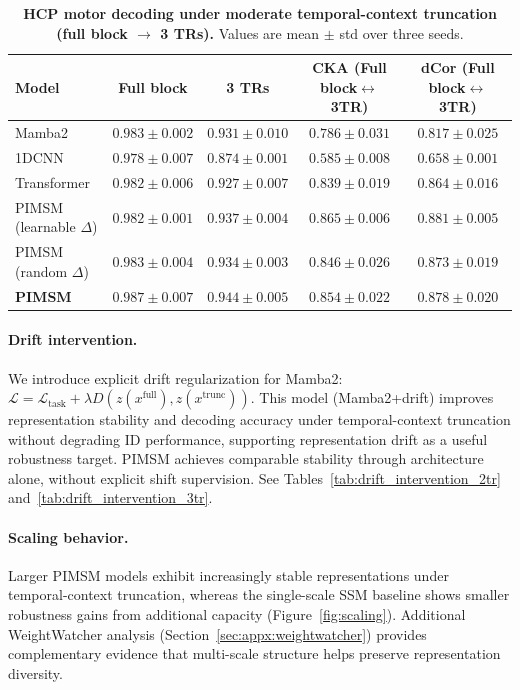 \documentclass{article}
\begin{document}
\begin{table}[htbp]
\centering
\footnotesize
\begin{tabular}{lcccc}
\toprule
Model & Full block & 3 TRs & CKA (Full block$\leftrightarrow$3TR) & dCor (Full block$\leftrightarrow$3TR) \\
\midrule
Mamba2 & $0.983\pm0.002$ & $0.931\pm0.010$ & $0.786\pm0.031$ & $0.817\pm0.025$ \\
1DCNN & $0.978\pm0.007$ & $0.874\pm0.001$ & $0.585\pm0.008$ & $0.658\pm0.001$ \\
Transformer & $0.982\pm0.006$ & $0.927\pm0.007$ & $0.839\pm0.019$ & $0.864\pm0.016$ \\
PIMSM (learnable $\Delta$) & $0.982\pm0.001$ & $0.937\pm0.004$ & $0.865\pm0.006$ & $0.881\pm0.005$ \\
PIMSM (random $\Delta$) & $0.983\pm0.004$ & $0.934\pm0.003$ & $0.846\pm0.026$ & $0.873\pm0.019$ \\
\midrule
\textbf{PIMSM} & $\mathbf{0.987\pm0.007}$ & $\mathbf{0.944\pm0.005}$ & $\mathbf{0.854\pm0.022}$ & $\mathbf{0.878\pm0.020}$ \\
\bottomrule
\end{tabular}
\caption{
\textbf{HCP motor decoding under moderate temporal-context truncation (full block $\rightarrow$ 3 TRs).}
Values are mean $\pm$ std over three seeds.
}
\label{tab:drift3tr}
\end{table}


\paragraph{Drift intervention.}
We introduce explicit drift regularization for Mamba2: $\mathcal{L} = \mathcal{L}_{\text{task}} + \lambda D(z(x^{\text{full}}), z(x^{\text{trunc}}))$. This model (Mamba2+drift) improves representation stability and decoding accuracy under temporal-context truncation without degrading ID performance, supporting representation drift as a useful robustness target. PIMSM achieves comparable stability through architecture alone, without explicit shift supervision. See Tables~\ref{tab:drift_intervention_2tr} and~\ref{tab:drift_intervention_3tr}.

\paragraph{Scaling behavior.}
Larger PIMSM models exhibit increasingly stable representations under temporal-context truncation, whereas the single-scale SSM baseline shows smaller robustness gains from additional capacity (Figure~\ref{fig:scaling}). Additional WeightWatcher analysis (Section~\ref{sec:appx:weightwatcher}) provides complementary evidence that multi-scale structure helps preserve representation diversity.
\end{document}
